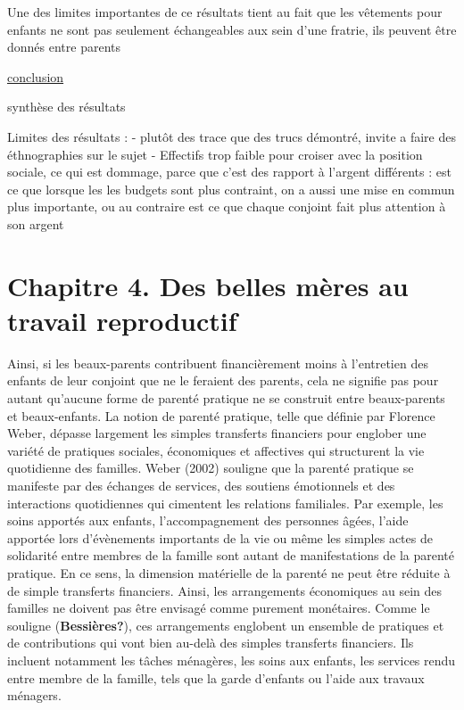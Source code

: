 \documentclass[
  12pt,
]{book}
\begin{document}
Une des limites importantes de ce résultats tient au fait que les
vêtements pour enfants ne sont pas seulement échangeables aux sein d'une
fratrie, ils peuvent être donnés entre parents

\hyperref[conclusion]{conclusion}

synthèse des résultats

Limites des résultats : - plutôt des trace que des trucs démontré,
invite a faire des éthnographies sur le sujet - Effectifs trop faible
pour croiser avec la position sociale, ce qui est dommage, parce que
c'est des rapport à l'argent différents : est ce que lorsque les les
budgets sont plus contraint, on a aussi une mise en commun plus
importante, ou au contraire est ce que chaque conjoint fait plus
attention à son argent

\chapter{Chapitre 4. Des belles mères au travail
reproductif}\label{chapitre-4.-des-belles-muxe8res-au-travail-reproductif}

Ainsi, si les beaux-parents contribuent financièrement moins à
l'entretien des enfants de leur conjoint que ne le feraient des parents,
cela ne signifie pas pour autant qu'aucune forme de parenté pratique ne
se construit entre beaux-parents et beaux-enfants. La notion de parenté
pratique, telle que définie par Florence Weber, dépasse largement les
simples transferts financiers pour englober une variété de pratiques
sociales, économiques et affectives qui structurent la vie quotidienne
des familles. Weber (2002) souligne que la parenté pratique se manifeste
par des échanges de services, des soutiens émotionnels et des
interactions quotidiennes qui cimentent les relations familiales. Par
exemple, les soins apportés aux enfants, l'accompagnement des personnes
âgées, l'aide apportée lors d'évènements importants de la vie ou même
les simples actes de solidarité entre membres de la famille sont autant
de manifestations de la parenté pratique. En ce sens, la dimension
matérielle de la parenté ne peut être réduite à de simple transferts
financiers. Ainsi, les arrangements économiques au sein des familles ne
doivent pas être envisagé comme purement monétaires. Comme le souligne
(\textbf{Bessières?}), ces arrangements englobent un ensemble de
pratiques et de contributions qui vont bien au-delà des simples
transferts financiers. Ils incluent notamment les tâches ménagères, les
soins aux enfants, les services rendu entre membre de la famille, tels
que la garde d'enfants ou l'aide aux travaux ménagers.
\end{document}
